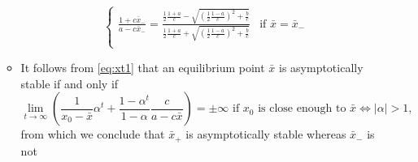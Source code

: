 \documentclass[12pt,a4paper]{article}
\begin{document}
\begin{itemize}
\begin{itemize}
\begin{equation}
\begin{cases}
        \frac{1+c\bar{x}_{-}}{a-c\bar{x}_{-}} = 
        \frac{\frac{1}{2}\frac{1+a}{c} - \sqrt{\left(\frac{1}{2}\frac{1-a}{c}\right)^{2} + \frac{b}{c}}}{\frac{1}{2}\frac{1+a}{c} + \sqrt{\left(\frac{1}{2}\frac{1-a}{c}\right)^{2} + \frac{b}{c}}} & \text{if $\bar{x}=\bar{x}_{-}$}\\
      \end{cases}
    \end{equation}
  \item It follows from \eqref{eq:xt1} that an equilibrium point $\bar{x}$ is asymptotically stable if and only if
    \begin{equation}\nonumber%
      \lim_{t\to\infty} \left(\frac{1}{x_{0}-\bar{x}}\alpha^{t} + \frac{1-\alpha^{t}}{1-\alpha} \frac{c}{a-c\bar{x}}\right) = \pm \infty
      \text{ if $x_{0}$ is close enough to $\bar{x}$}
      \iff
      |\alpha|>1,
    \end{equation}
    from which we conclude that
    $\bar{x}_{+}$ is asymptotically stable
    whereas
    $\bar{x}_{-}$ is not
  \end{itemize}


\end{itemize}
\end{document}
